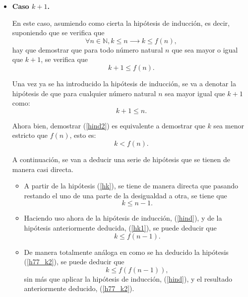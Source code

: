 \begin{demostracion}
\begin{itemize}
    \item \textbf{Caso \(k+1\).}

      En este caso, asumiendo como cierta la hipótesis de inducción,
      es decir, suponiendo que se verifica que
      \begin{equation}\label{hind}\tag{h\(\_\)ind}
        ∀ n ∈ ℕ, k ≤ n ⟶ k ≤ f(n),
      \end{equation}
      hay que demostrar que para todo número natural \(n\) que
      sea mayor o igual que \(k+1\), se verifica que
      \begin{equation}\label{hind2}
        k+1 ≤ f(n).
      \end{equation}

      Una vez ya se ha introducido la hipótesis de inducción, se va
      a denotar la hipótesis de que para cualquier número natural
      \(n\) sea mayor igual que \(k+1\) como:
      \begin{equation}\label{hk}\tag{hk}
        k+1 ≤ n.
      \end{equation}

      Ahora bien, demostrar (\ref{hind2}) es equivalente a demostrar
      que \(k\) sea menor estricto que \(f(n)\), esto es:
      \begin{equation}\label{hind3}
        k < f(n).
      \end{equation}

      A continuación, se van a deducir una serie de hipótesis que se
      tienen de manera casi directa.
      \begin{itemize}
      \item A partir de la hipótesis (\ref{hk}), se tiene de manera
        directa que pasando restando el uno de una parte de la
        desigualdad a otra, se tiene que
        \begin{equation}\label{hk1}\tag{hk1}
          k ≤ n-1.
        \end{equation}

      \item Haciendo uso ahora de la hipótesis de inducción,
        (\ref{hind}), y de la hipótesis anteriormente deducida,
        (\ref{hk1}), se puede deducir que
        \begin{equation}\label{h77_k2}\tag{hk2}
          k ≤ f(n-1).
        \end{equation}

      \item De manera totalmente análoga en como se ha deducido
        la hipótesis (\ref{h77_k2}), se puede deducir que
        \begin{equation}\label{hk3}\tag{hk3}
          k ≤ f(f(n-1)),
        \end{equation}
        sin más que aplicar la hipótesis de inducción, (\ref{hind}),
        y el resultado anteriormente deducido, (\ref{h77_k2}).


\end{itemize}
\end{itemize}
\end{demostracion}
